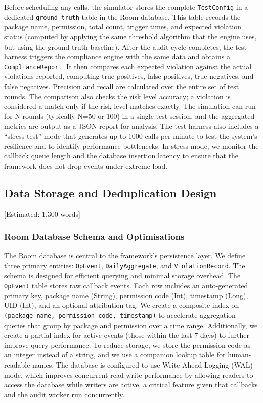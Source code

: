 Before scheduling any calls, the simulator stores the complete \texttt{TestConfig} in a dedicated \texttt{ground\_truth} table in the Room database. This table records the package name, permission, total count, trigger times, and expected violation status (computed by applying the same threshold algorithm that the engine uses, but using the ground truth baseline). After the audit cycle completes, the test harness triggers the compliance engine with the same data and obtains a \texttt{ComplianceReport}. It then compares each expected violation against the actual violations reported, computing true positives, false positives, true negatives, and false negatives. Precision and recall are calculated over the entire set of test rounds. The comparison also checks the risk level accuracy; a violation is considered a match only if the risk level matches exactly. The simulation can run for N rounds (typically N=50 or 100) in a single test session, and the aggregated metrics are output as a JSON report for analysis. The test harness also includes a ``stress test'' mode that generates up to 1000 calls per minute to test the system's resilience and to identify performance bottlenecks. In stress mode, we monitor the callback queue length and the database insertion latency to ensure that the framework does not drop events under extreme load.

\subsection{Data Storage and Deduplication Design} [Estimated: 1,300 words]

\subsubsection{Room Database Schema and Optimisations}

The Room database is central to the framework's persistence layer. We define three primary entities: \texttt{OpEvent}, \texttt{DailyAggregate}, and \texttt{ViolationRecord}. The schema is designed for efficient querying and minimal storage overhead. The \texttt{OpEvent} table stores raw callback events. Each row includes an auto-generated primary key, package name (String), permission code (Int), timestamp (Long), UID (Int), and an optional attribution tag. We create a composite index on \texttt{(package\_name, permission\_code, timestamp)} to accelerate aggregation queries that group by package and permission over a time range. Additionally, we create a partial index for active events (those within the last 7 days) to further improve query performance. To reduce storage, we store the permission code as an integer instead of a string, and we use a companion lookup table for human-readable names. The database is configured to use Write-Ahead Logging (WAL) mode, which improves concurrent read-write performance by allowing readers to access the database while writers are active, a critical feature given that callbacks and the audit worker run concurrently.

